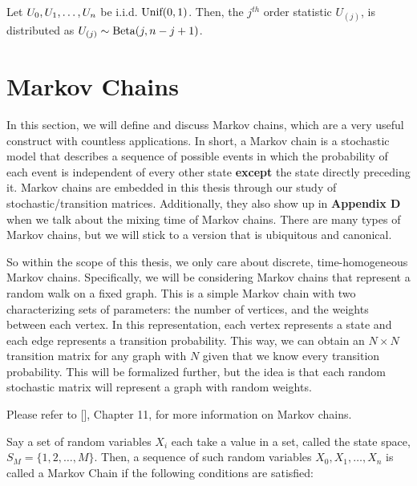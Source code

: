 \begin{theorem}
Let $\seq[n]{U}$ be i.i.d. $\Unif(0, 1)$. Then, the $j^{th}$ order statistic $U_{(j)}$, is distributed as $U_{(j)} \sim \Beta(j, n-j+1)$.
\end{theorem}

\newpage
\section{Markov Chains}


In this section, we will define and discuss Markov chains, which are a very useful construct with countless applications.
In short, a Markov chain is a stochastic model that describes a sequence of possible events in which the probability of each event is independent of every other state \textbf{except} the state directly preceding it.
Markov chains are embedded in this thesis through our study of stochastic/transition matrices. Additionally, they also show up in \textbf{Appendix D} when we talk about the mixing time of Markov chains.
There are many types of Markov chains, but we will stick to a version that is ubiquitous and canonical.

So within the scope of this thesis, we only care about discrete, time-homogeneous Markov chains.
Specifically, we will be considering Markov chains that represent a random walk on a fixed graph.
This is a simple Markov chain with two characterizing sets of parameters: the number of vertices, and the weights between each vertex.
In this representation, each vertex represents a state and each edge represents a transition probability.
This way, we can obtain an $N \times N$ transition matrix for any graph with $N$ given that we know every transition probability.
This will be formalized further, but the idea is that each random stochastic matrix will represent a graph with random weights.

Please refer to [\cite{blitz}], Chapter 11, for more information on Markov chains.

\begin{definition} Say a set of random variables $X_i$ each take a value in a set, called the state space, $S_M = \{1,2,\dots,M\}$. Then, a sequence of such random variables $X_0,X_1,\dots,X_n$ is called a Markov Chain if the following conditions are satisfied:
\end{definition}

